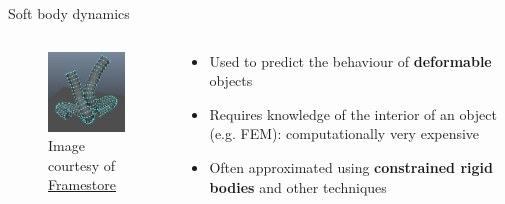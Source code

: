 \begin{frame}{Soft body dynamics}
	\begin{columns}
		\begin{column}{0.3\textwidth}
			\begin{figure}
				\includegraphics[width=\textwidth]{soft_bodies}
				\caption*{Image courtesy of \href{https://www.framestore.com}{Framestore}}
			\end{figure}
		\end{column}
		\begin{column}{0.65\textwidth}
			\begin{itemize}
				\pause\item Used to predict the behaviour of \textbf{deformable} objects
				\pause\item Requires knowledge of the interior of an object (e.g. FEM): computationally very expensive
				\pause\item Often approximated using \textbf{constrained rigid bodies} and other techniques
			\end{itemize}
		\end{column}
	\end{columns}
\end{frame}

